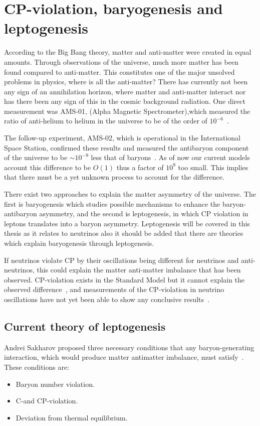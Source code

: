 \section{CP-violation, baryogenesis and leptogenesis}
According to the Big Bang theory, matter and anti-matter were created in equal amounts\cite{14Berry}. Through observations of the universe, much more matter has been found compared to anti-matter. This constitutes one of the major unsolved problems in physics, where is all the anti-matter? There has currently not been any sign of an annihilation horizon, where matter and anti-matter interact nor has there been any sign of this in the cosmic background radiation\cite{14Berry}. One direct measurement was AMS-01, (Alpha Magnetic Spectrometer),which measured the ratio of anti-helium to helium in the universe to be of the order of $10^{-6}$~\cite{15AMS1}. 

The follow-up experiment, AMS-02, which is operational in the International Space Station, confirmed these results and measured the antibaryon component of the universe to be $\sim 10^{-9}$ less that of baryons~\cite{16AMS2}. As of now our current models account this difference to be $O(1)$ thus a factor of $10^9$ too small\cite{49Matter}. This implies that there must be a yet unknown process to account for the difference.

There exist two approaches to explain the matter asymmetry of the universe. The first is baryogenesis which studies possible mechanisms to enhance the baryon-antibaryon asymmetry, and the second is leptogenesis, in which CP violation in leptons translates into a baryon asymmetry. Leptogenesis will be covered in this thesis as it relates to neutrinos also it should be added that there are theories which explain baryogenesis through leptogenesis.

If neutrinos violate CP by their oscillations being different for neutrinos and anti-neutrinos, this could explain the matter anti-matter imbalance that has been observed. CP-violation exists in the Standard Model but it cannot explain the observed difference~\cite{3Peskin}, and measurements of the CP-violation in neutrino oscillations have not yet been able to show any conclusive results~\cite{17Gonzalez}.

\subsection{Current theory of leptogenesis}
Andrei Sakharov proposed three necessary conditions that any baryon-generating interaction, which would produce matter antimatter imbalance, must satisfy~\cite{37Sakharov}. These conditions are:
\begin{itemize}
\item Baryon number violation.
\item C-and CP-violation.
\item Deviation from thermal equilibrium.
\end{itemize}

